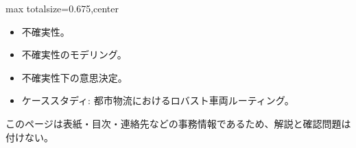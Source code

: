 \clearpage
{}
\begin{adjustbox}{max totalsize={\textwidth}{0.675\textheight},center}
\begin{minipage}{\textwidth}\scriptsize
\begin{minipage}[t]{0.485\textwidth}
\begin{itemize}
\item 不確実性。
\item 不確実性のモデリング。
\item 不確実性下の意思決定。
\item ケーススタディ: 都市物流におけるロバスト車両ルーティング。
\end{itemize}
\end{minipage}\hfill
\begin{minipage}[t]{0.485\textwidth}
{\small このページは表紙・目次・連絡先などの事務情報であるため、解説と確認問題は付けない。}
\end{minipage}
\end{minipage}
\end{adjustbox}

